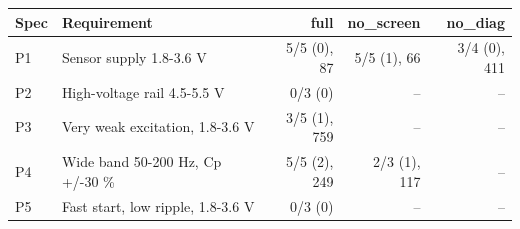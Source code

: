 \begin{tabular}{llrrr}
\toprule
Spec & Requirement & full & no\_screen & no\_diag \\
\midrule
P1 & Sensor supply 1.8-3.6 V & 5/5 (0), 87 & 5/5 (1), 66 & 3/4 (0), 411 \\
P2 & High-voltage rail 4.5-5.5 V & 0/3 (0) & -- & -- \\
P3 & Very weak excitation, 1.8-3.6 V & 3/5 (1), 759 & -- & -- \\
P4 & Wide band 50-200 Hz, Cp +/-30 \% & 5/5 (2), 249 & 2/3 (1), 117 & -- \\
P5 & Fast start, low ripple, 1.8-3.6 V & 0/3 (0) & -- & -- \\
\bottomrule
\end{tabular}
